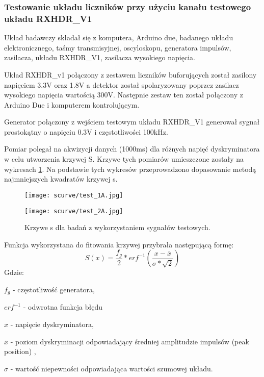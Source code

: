\subsubsection{Testowanie układu liczników przy użyciu kanału testowego układu RXHDR\_V1}
\label{section RXHDR test}

Układ badawczy składał się z komputera, Arduino due, badanego układu elektronicznego, taśmy transmisyjnej, oscyloskopu, generatora impulsów, zasilacza, układu RXHDR\_V1, zasilacza wysokiego napięcia. 

Układ RXHDR\_v1 połączony z zestawem liczników buforujących został zasilony napięciem 3.3V oraz 1.8V a detektor został spolaryzowany poprzez zasilacz wysokiego napięcia wartością 300V. Następnie zestaw ten został połączony z Arduino Due i komputerem kontrolującym. 

Generator połączony z wejściem testowym układu RXHDR\_V1 generował sygnał prostokątny o napięciu 0.3V i częstotliwości 100kHz. 

Pomiar polegał na akwizycji danych (1000ms) dla różnych napięć dyskryminatora w celu utworzenia krzywej S. Krzywe tych pomiarów umieszczone zostały na wykresach \ref{s curve test}. Na podstawie tych wykresów przeprowadzono dopasowanie metodą najmniejszych kwadratów krzywej s.

\begin{figure}
        \centering
        \begin{multicols}{2}
                \texttt{[image: scurve/test\_1A.jpg]} \par
                \texttt{[image: scurve/test\_2A.jpg]} \par
        \end{multicols}
        \caption{Krzywe s dla badań z wykorzystaniem sygnałów testowych.}\label{s curve test}
\end{figure}

Funkcja wykorzystana do fitowania krzywej przybrała następującą formę:
\begin{equation}
        \label{test eq}
        S(x) = \frac{f_g}{2} * erf^{-1}(\frac{x-\overline{x}}{\sigma*\sqrt{2}})
\end{equation}
Gdzie:
\begin{description}
        \item $f_g$ - częstotliwość generatora,
        \item $erf^{-1}$ - odwrotna funkcja błędu
        \item $x$ - napięcie dyskryminatora,
        \item $\overline{x}$ - poziom dyskryminacji odpowiadający średniej amplitudzie impulsów (peak position) ,
        \item  $\sigma$ - wartość niepewności odpowiadająca wartości szumowej układu. 
\end{description}

